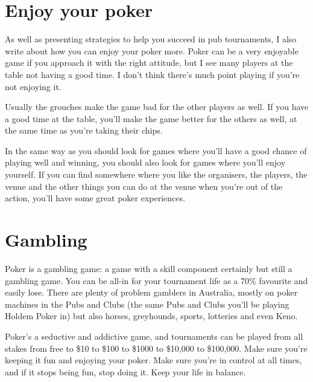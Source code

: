 
\section{Enjoy your poker}

As well as presenting strategies to help you succeed
in pub tournaments,
I also write about how you can enjoy your poker
more. Poker can be a very enjoyable game if you approach
it with the right attitude, but I see many players at the table
not having a good time. I don't think there's much
point playing if you're not enjoying it.

Usually the grouches make the game bad for the other
players as well. If you have a good time at the table, you'll make the
game better for the others as well, at the same time as you're taking
their chips.

In the same way as you should look for games where you'll have
a good chance of playing well and winning, you should
also look for games where you'll enjoy yourself.
If you can find somewhere where you like
the organisers, the players, the venue and the other things
you can do at the venue when you're out of the action,
you'll have some great poker experiences.

\section{Gambling}

Poker is a gambling
game: a game with a skill component certainly but still
a gambling game. You can be all-in for your tournament life
as a 70\% favourite and easily lose. There are plenty of problem gamblers
in Australia, mostly on poker machines in the Pubs and Clubs
(the same Pubs and Clubs you'll be playing Holdem Poker
in) but also horses, greyhounds, sports, lotteries and even Keno.

Poker's a seductive and addictive game,
and tournaments can be played from all stakes from free to \$10 to \$100
to \$1000 to \$10,000 to \$100,000. Make sure you're keeping it fun
and enjoying your poker. Make sure you're in control at all times,
and if it stops being fun, stop doing it. Keep your life in balance.



